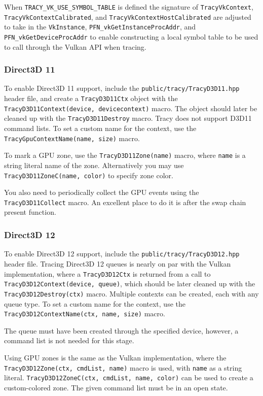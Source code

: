 \documentclass[hidelinks,titlepage,a4paper,twoside]{article}
\begin{document}
When \texttt{TRACY\_VK\_USE\_SYMBOL\_TABLE} is defined the signature of \texttt{TracyVkContext}, \texttt{TracyVkContextCalibrated}, and \texttt{TracyVkContextHostCalibrated} are adjusted to take in the \texttt{VkInstance}, \texttt{PFN\_vkGetInstanceProcAddr}, and \texttt{PFN\_vkGetDeviceProcAddr} to enable constructing a local symbol table to be used to call through the Vulkan API when tracing.

\subsubsection{Direct3D 11}

To enable Direct3D 11 support, include the \texttt{public/tracy/TracyD3D11.hpp} header file, and create a \texttt{TracyD3D11Ctx} object with the \texttt{TracyD3D11Context(device, devicecontext)} macro. The object should later be cleaned up with the \texttt{TracyD3D11Destroy} macro. Tracy does not support D3D11 command lists. To set a custom name for the context, use the \texttt{TracyGpuContextName(name, size)} macro.

To mark a GPU zone, use the \texttt{TracyD3D11Zone(name)} macro, where \texttt{name} is a string literal name of the zone. Alternatively you may use \texttt{TracyD3D11ZoneC(name, color)} to specify zone color.

You also need to periodically collect the GPU events using the \texttt{TracyD3D11Collect} macro. An excellent place to do it is after the swap chain present function.

\subsubsection{Direct3D 12}

To enable Direct3D 12 support, include the \texttt{public/tracy/TracyD3D12.hpp} header file. Tracing Direct3D 12 queues is nearly on par with the Vulkan implementation, where a \texttt{TracyD3D12Ctx} is returned from a call to \texttt{TracyD3D12Context(device, queue)}, which should be later cleaned up with the \texttt{TracyD3D12Destroy(ctx)} macro. Multiple contexts can be created, each with any queue type. To set a custom name for the context, use the \texttt{TracyD3D12ContextName(ctx, name, size)} macro.

The queue must have been created through the specified device, however, a command list is not needed for this stage.

Using GPU zones is the same as the Vulkan implementation, where the \texttt{TracyD3D12Zone(ctx, cmdList, name)} macro is used, with \texttt{name} as a string literal. \texttt{TracyD3D12ZoneC(ctx, cmdList, name, color)} can be used to create a custom-colored zone. The given command list must be in an open state.
\end{document}
